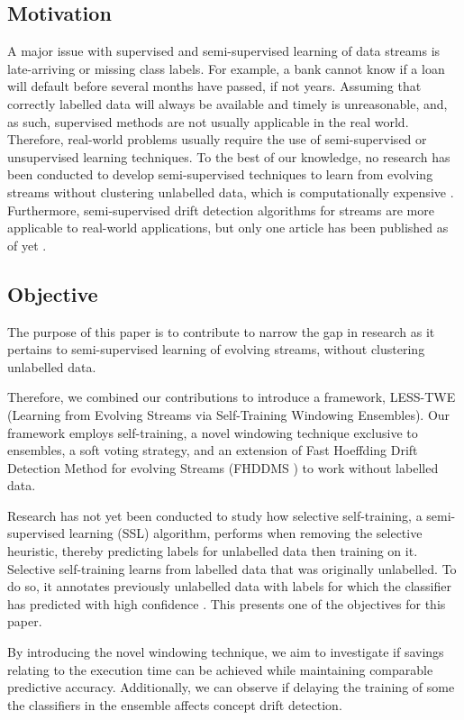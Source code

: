 \documentclass[runningheads]{llncs}
\begin{document}
\subsection{Motivation}
A major issue with supervised and semi-supervised learning of data streams is late-arriving or missing class labels. For example, a bank cannot know if a loan will default before several months have passed, if not years. Assuming that correctly labelled data will always be available and timely is unreasonable, and, as such, supervised methods are not usually applicable in the real world. Therefore, real-world problems usually require the use of semi-supervised or unsupervised learning techniques. To the best of our knowledge, no research has been conducted to develop semi-supervised techniques to learn from evolving streams without clustering unlabelled data, which is computationally expensive \cite{krempl2014open}. Furthermore, semi-supervised drift detection algorithms for streams are more applicable to real-world applications, but only one article has been published as of yet \cite{haque2015sand}.

\subsection{Objective\label{section:intro:objective}}
The purpose of this paper is to contribute to narrow the gap in research as it pertains to semi-supervised learning of evolving streams, without clustering unlabelled data.

Therefore, we combined our contributions to introduce a framework, LESS-TWE (Learning from Evolving Streams via Self-Training Windowing Ensembles). Our framework employs self-training, a novel windowing technique exclusive to ensembles, a soft voting strategy, and an extension of Fast Hoeffding Drift Detection Method for evolving Streams (FHDDMS \cite{pesaranghader2018reservoir}) to work without labelled data.

Research has not yet been conducted to study how selective self-training, a semi-supervised learning (SSL) algorithm, performs when removing the selective heuristic, thereby predicting labels for unlabelled data then training on it. Selective self-training learns from labelled data that was originally unlabelled. To do so, it annotates previously unlabelled data with labels for which the classifier has predicted with high confidence \cite{zhu2009selftraining}. This presents one of the objectives for this paper.

By introducing the novel windowing technique, we aim to investigate if savings relating to the execution time can be achieved while maintaining comparable predictive accuracy. Additionally, we can observe if delaying the training of some the classifiers in the ensemble affects concept drift detection.
\end{document}
